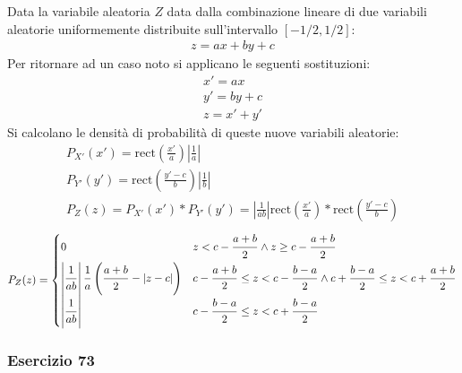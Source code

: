 \documentclass{article}
\newcommand{\rect}{\mathrm{rect}}
\begin{document}
Data la variabile aleatoria $Z$ data dalla combinazione lineare di due variabili aleatorie uniformemente distribuite sull'intervallo $[-1/2,1/2]$:
\begin{gather*}
    z=ax+by+c
\end{gather*}
Per ritornare ad un caso noto si applicano le seguenti sostituzioni:
\begin{gather*}
    x'=ax\\
    y'=by+c\\
    z=x'+y'
\end{gather*}
Si calcolano le densità di probabilità di queste nuove variabili aleatorie:
\begin{gather*}
    P_{X'}(x')=\rect\displaystyle\left(\frac{x'}{a}\right)\left|\frac{1}{a}\right|\\
    P_{Y'}(y')=\rect\displaystyle\left(\frac{y'-c}{b}\right)\left|\frac{1}{b}\right|\\
    P_Z(z)=P_{X'}(x')*P_{Y'}(y')=\displaystyle\left|\frac{1}{ab}\right|\rect\left(\frac{x'}{a}\right)*\rect\left(\frac{y'-c}{b}\right)
\end{gather*}
\begin{equation}
    P_Z(z)=\begin{cases}
        0 &z<c-\displaystyle\frac{\strut a+b}{\strut 2} \land z\geq c-\frac{\strut a+b}{\strut 2}\\
        \displaystyle \left|\frac{\strut 1}{\strut ab}\right|\frac{\strut 1}{\strut a}\left(\frac{\strut a+b}{\strut 2}-|z-c|\right)&\displaystyle c-\frac{\strut a+b}{2}\leq z< c-\frac{\strut b-a}{\strut 2}\land c+\frac{\strut b-a}{\strut 2}\leq z<c+\frac{\strut a+b}{\strut 2}\\
        \displaystyle\left|\frac{\strut 1}{\strut ab}\right|&c-\displaystyle\frac{\strut b-a}{\strut 2}\leq z<c+\frac{\strut b-a}{\strut 2}
    \end{cases}
\end{equation}

\subsubsection*{Esercizio 73}
\end{document}
